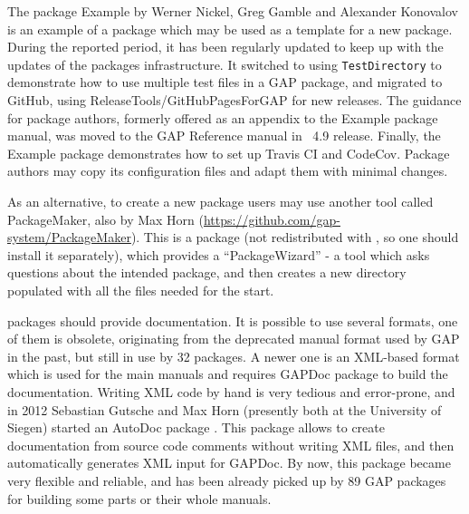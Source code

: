 \documentclass{deliverablereport}
\begin{document}
The \GAP package {\sf Example} by Werner Nickel, Greg Gamble and
Alexander Konovalov \cite{example}
is an example of a \GAP package which may be used as a template for 
a new package. During the reported period, it has been regularly updated
to keep up with the updates of the packages infrastructure. It
switched to using {\tt TestDirectory} to demonstrate how to use 
multiple test files in a GAP package, and migrated
to GitHub, using {\sf ReleaseTools/GitHubPagesForGAP}
for new releases. The guidance for package authors, formerly offered
as an appendix to the {\sf Example} package manual, was moved to the GAP
Reference manual in \GAP~4.9 release. Finally, the {\sf Example} package
demonstrates how to set up Travis CI and CodeCov. Package authors
may copy its configuration files and adapt them with minimal changes.

As an alternative, to create a new package
\GAP users may use another tool called {\sf PackageMaker},
also by Max Horn (\url{https://github.com/gap-system/PackageMaker}). This is
a \GAP package (not redistributed with \GAP, so one should install it
separately), which provides a ``PackageWizard'' - a tool which asks questions
about the intended package, and then creates a new directory populated with 
all the files needed for the start.

\GAP packages should provide documentation. It is possible to use several
formats, one of them is obsolete, originating from the deprecated 
manual format used by GAP in the past, but still in use by 32 packages.
A newer one is an XML-based format which is used for the main \GAP manuals
and requires {\sf GAPDoc package} to build the documentation. Writing XML
code by hand is very tedious and error-prone, and in 2012 Sebastian Gutsche 
and Max Horn (presently both at the University of Siegen) started an 
{\sf AutoDoc} package \cite{autodoc}.
This package allows to create documentation from source code comments
without writing XML files, and then automatically generates XML input
for GAPDoc. By now, this package became very flexible and reliable, and
has been already picked up by 89 GAP packages for building 
some parts or their whole manuals.
%
%
\end{document}

